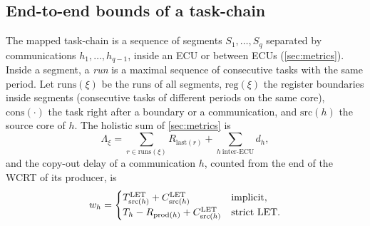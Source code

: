 \subsection{End-to-end bounds of a task-chain}
\label{sec:e2e}

The mapped task-chain is a sequence of segments $S_1,\dots,S_q$ separated
by communications $h_1,\dots,h_{q-1}$, inside an ECU or between ECUs
(\cref{sec:metrics}). Inside a segment, a \emph{run} is a maximal sequence
of consecutive tasks with the same period. Let $\mathrm{runs}(\xi)$ be the
runs of all segments, $\mathrm{reg}(\xi)$ the register boundaries inside
segments (consecutive tasks of different periods on the same core),
$\mathrm{cons}(\cdot)$ the task right after a boundary or a communication,
and $\mathrm{src}(h)$ the source core of $h$. The holistic sum of
\cref{sec:metrics} is
\begin{equation}
\Lambda_\xi=\sum_{r\in\mathrm{runs}(\xi)}R_{\mathrm{last}(r)}
	+\sum_{h\ \text{inter-ECU}}d_h,\label{eq:latency}
\end{equation}
and the copy-out delay of a communication $h$, counted from the end of
the WCRT of its producer, is
\begin{equation}
w_h=\begin{cases}
T^{\mathrm{LET}}_{\mathrm{src}(h)}+C^{\mathrm{LET}}_{\mathrm{src}(h)} & \text{implicit,}\\
T_h-R_{\mathrm{prod}(h)}+C^{\mathrm{LET}}_{\mathrm{src}(h)} & \text{strict LET.}
\end{cases}\label{eq:copy-out}
\end{equation}

